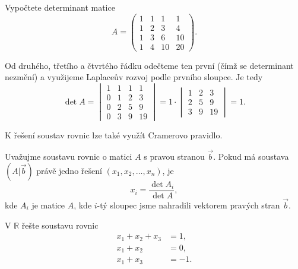 \begin{priklad}
Vypočtete determinant matice
$$A=\begin{pmatrix}
    1  &1 &1 &1\\
    1 &2 &3 &4 \\
    1 &3 &6 &10\\
    1 &4 &10 &20
\end{pmatrix}.$$
\end{priklad}

\begin{reseni}
Od druhého, třetího a čtvrtého řádku odečteme ten první (čímž se determinant nezmění)
a využijeme Laplaceův rozvoj podle prvního sloupce. Je tedy
$$\det A = \begin{vmatrix}
    1 &1 &1 &1\\
    0 &1 &2 &3 \\
    0 &2 &5 &9 \\
    0 &3 &9 &19
\end{vmatrix}=1 \cdot \begin{vmatrix}
1 &2 &3 \\
2 &5 &9\\
3 &9 &19
\end{vmatrix}=1.$$
\end{reseni}

K řešení soustav rovnic lze také využít Cramerovo pravidlo.

\begin{veta}
	Uvažujme soustavu rovnic o matici $A$ s pravou stranou $\vec b$. Pokud má soustava $\left (
	A | \vec b
	\right )$ právě jedno řešení $(x_1, x_2, \dots, x_n)$, je
	$$
	    x_i=\frac{\det A_i}{\det A},
	$$
	kde $A_i$ je matice $A$, kde $i$-tý sloupec jsme nahradili vektorem pravých stran $\vec b$.
\end{veta}

\begin{priklad}
V $\mathbb R$ řešte soustavu rovnic
\begin{align*}
    x_1+x_2+x_3 &=1,\\
    x_1+x_2 &= 0,\\
    x_1+x_3 &=-1.
\end{align*}
\end{priklad}

